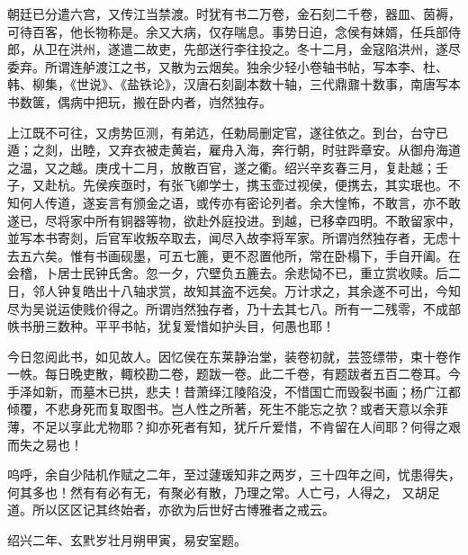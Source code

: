 朝廷已分遣六宫，又传江当禁渡。时犹有书二万卷，金石刻二千卷，器皿、茵褥，可待百客，他长物称是。余又大病，仅存喘息。事势日迫，念侯有妹婿，任兵部侍郎，从卫在洪州，遂遣二故吏，先部送行李往投之。冬十二月，金寇陷洪州，遂尽委弃。所谓连舻渡江之书，又散为云烟矣。独余少轻小卷轴书帖，写本李、杜、韩、柳集，《世说》、《盐铁论》，汉唐石刻副本数十轴，三代鼎鼐十数事，南唐写本书数箧，偶病中把玩，搬在卧内者，岿然独存。


上江既不可往，又虏势叵测，有弟迒，任勅局删定官，遂往依之。到台，台守已遁；之剡，出睦，又弃衣被走黄岩，雇舟入海，奔行朝，时驻跸章安。从御舟海道之温，又之越。庚戌十二月，放散百官，遂之衢。绍兴辛亥春三月，复赴越；壬子，又赴杭。先侯疾亟时，有张飞卿学士，携玉壶过视侯，便携去，其实珉也。不知何人传道，遂妄言有颁金之语，或传亦有密论列者。余大惶怖，不敢言，亦不敢遂已，尽将家中所有铜器等物，欲赴外庭投进。到越，已移幸四明。不敢留家中，並写本书寄剡，后官军收叛卒取去，闻尽入故李将军家。所谓岿然独存者，无虑十去五六矣。惟有书画砚墨，可五七簏，更不忍置他所，常在卧榻下，手自开阖。在会稽，卜居士民钟氏舍。忽一夕，穴壁负五簏去。余悲恸不已，重立赏收赎。后二日，邻人钟复皓出十八轴求赏，故知其盗不远矣。万计求之，其余遂不可出，今知尽为吴说运使贱价得之。所谓岿然独存者，乃十去其七八。所有一二残零，不成部帙书册三数种。平平书帖，犹复爱惜如护头目，何愚也耶！


今日忽阅此书，如见故人。因忆侯在东莱静治堂，装卷初就，芸签缥带，束十卷作一帙。每日晚吏散，輙校勘二卷，题跋一卷。此二千卷，有题跋者五百二卷耳。今手泽如新，而墓木已拱，悲夫！昔萧绎江陵陷没，不惜国亡而毁裂书画；杨广江都倾覆，不悲身死而复取图书。岂人性之所著，死生不能忘之欤？或者天意以余菲薄，不足以享此尤物耶？抑亦死者有知，犹斤斤爱惜，不肯留在人间耶？何得之艰而失之易也！


呜呼，余自少陆机作赋之二年，至过蘧瑗知非之两岁，三十四年之间，忧患得失，何其多也！然有有必有无，有聚必有散，乃理之常。人亡弓，人得之，
又胡足道。所以区区记其终始者，亦欲为后世好古博雅者之戒云。


绍兴二年、玄黓岁壮月朔甲寅，易安室题。